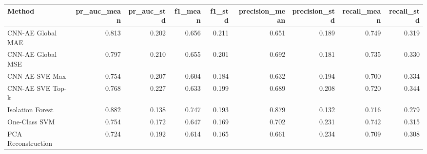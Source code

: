 \begin{tabular}{lrrrrrrrr}
\toprule
Method & pr_auc_mean & pr_auc_std & f1_mean & f1_std & precision_mean & precision_std & recall_mean & recall_std \\
\midrule
CNN-AE Global MAE & 0.813 & 0.202 & 0.656 & 0.211 & 0.651 & 0.189 & 0.749 & 0.319 \\
CNN-AE Global MSE & 0.797 & 0.210 & 0.655 & 0.201 & 0.692 & 0.181 & 0.735 & 0.330 \\
CNN-AE SVE Max & 0.754 & 0.207 & 0.604 & 0.184 & 0.632 & 0.194 & 0.700 & 0.334 \\
CNN-AE SVE Top-k & 0.768 & 0.227 & 0.633 & 0.199 & 0.689 & 0.208 & 0.720 & 0.344 \\
Isolation Forest & 0.882 & 0.138 & 0.747 & 0.193 & 0.879 & 0.132 & 0.716 & 0.279 \\
One-Class SVM & 0.754 & 0.172 & 0.647 & 0.169 & 0.702 & 0.231 & 0.742 & 0.315 \\
PCA Reconstruction & 0.724 & 0.192 & 0.614 & 0.165 & 0.661 & 0.234 & 0.709 & 0.308 \\
\bottomrule
\end{tabular}
